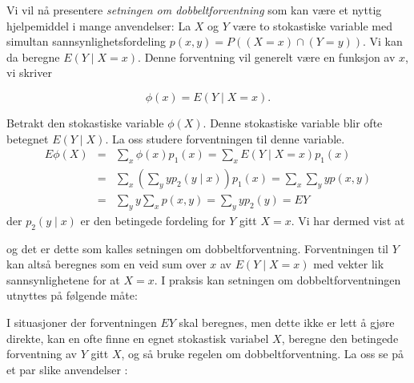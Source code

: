 Vi vil nå presentere {\em setningen om dobbeltforventning} som kan
være et nyttig hjelpemiddel i mange anvendelser:
La $X$ og $Y$ være to stokastiske variable med simultan
sannsynlighetsfordeling $p(x,y)=P((X=x)\cap (Y=y))$. Vi kan da
beregne $E(Y\mid X=x)$. Denne forventning vil generelt være en
funksjon av $x$, vi skriver

\[ \phi (x)=E(Y\mid X=x). \]

\noindent Betrakt den stokastiske variable $\phi (X)$. Denne stokastiske
variable blir ofte betegnet $E(Y\mid X)$. La oss studere
forventningen til denne variable.
\begin{eqnarray*}
E\phi (X)&=&\sum_x \phi(x)p_1(x)=\sum_x E(Y \mid X=x)p_1(x) \\
         &=&\sum_x (\sum_y yp_2(y\mid x))p_1(x)=\sum_x \sum_y yp(x,y) \\
         &=&\sum_y y \sum_x p(x,y) = \sum_y yp_2(y)=EY
\end{eqnarray*}
\noindent der $p_2(y\mid x)$ er den betingede fordeling for $Y$ gitt $X=x$.
Vi har dermed vist at
\begin{center} \framebox[10cm]{\begin{minipage}{9cm}
\[ \mbox{\ \ F12.\ \ \ \ \ } EE(Y\mid X)=EY  \]
\mbox{} \vspace{-0.5\belowdisplayskip}  \end{minipage}} \end{center}

\noindent og det er dette som kalles setningen om dobbeltforventning.
Forventningen til $Y$ kan altså beregnes som en veid sum over $x$
av $E(Y\mid X=x)$ med vekter lik sannsynlighetene for at $X=x$. I
praksis kan setningen om dobbeltforventningen utnyttes på
følgende måte:

I situasjoner der forventningen $EY$ skal beregnes, men dette
ikke er lett å gjøre direkte, kan en ofte finne en egnet
stokastisk variabel $X$, beregne den betingede forventning av $Y$
gitt $X$, og så bruke regelen om dobbeltforventning. La oss se på
et par slike anvendelser : \\


